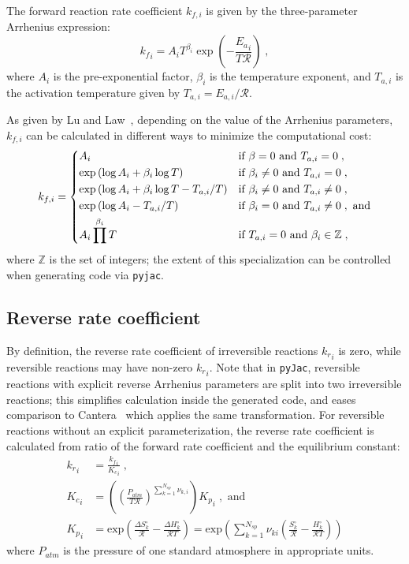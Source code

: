 \documentclass[12pt]{article}
\newcommand{\ns}{N_{sp}}
\newcommand{\Ru}{\mathcal{R}}
\begin{document}
The forward reaction rate coefficient $k_{f, i}$ is given by the three-parameter Arrhenius expression:
\begin{equation}
  \label{e:arrhenius}
  {k_f}_{i} = A_{i} T^{\beta_{i}} \operatorname{exp}\left({- \frac{{E_{a}}_{i}}{T \Ru}}\right) \;,
\end{equation}
where $A_i$ is the pre-exponential factor, $\beta_i$ is the temperature exponent, and $T_{a, i}$ is the activation temperature given by $T_{a, i} = E_{a, i} / \mathcal{R}$.

As given by Lu and Law~\cite{Lu:2009gh}, depending on the value of the Arrhenius parameters, $k_{f,i}$ can be calculated in different ways to minimize the computational cost:
\begin{equation}
  k_{f,i} =
  \begin{dcases}
  A_i & \text{if } \beta = 0 \text{ and } T_{a,i} = 0 \;, \\
  \exp \left( \log A_i + \beta_i \log T \right)   & \text{if } \beta_i \neq 0 \text{ and } T_{a, i} = 0 \;, \\
  \exp \left( \log A_i + \beta_i \log T - T_{a, i} / T \right) & \text{if } \beta_i \neq 0 \text{ and } T_{a, i} \neq 0 \;, \\
  \exp \left( \log A_i - T_{a, i} / T \right)  & \text{if } \beta_i = 0 \text{ and } T_{a, i} \neq 0 \;, \text{ and} \\
  A_i \prod^{\beta_i} T & \text{if } T_{a, i} = 0 \text{ and } \beta_i \in \mathbb{Z} \;,
  \end{dcases}
\end{equation}
where $\mathbb{Z}$ is the set of integers; the extent of this specialization can be controlled when generating code via \texttt{pyjac}.

\subsection{Reverse rate coefficient}
By definition, the reverse rate coefficient of irreversible reactions ${k_r}_{i}$ is zero, while reversible reactions may have non-zero ${k_r}_{i}$.
Note that in \texttt{pyJac}, reversible reactions with explicit reverse Arrhenius parameters are split into two irreversible reactions; this simplifies calculation inside the generated code, and eases comparison to Cantera~\cite{Goodwin:2015aa} which applies the same transformation.
For reversible reactions without an explicit parameterization, the reverse rate coefficient is calculated from ratio of the forward rate coefficient and the equilibrium constant:
\begin{align}
 {k_r}_{i} &= \frac{{k_f}_{i}}{{K_c}_{i}}\; , \label{e:kr}\\
 {K_c}_{i} &= \left(\left(\frac{P_{atm}}{T \Ru}\right)^{\sum_{k=1}^{\ns} \nu_{k,i}}\right) {K_p}_{i}\; ,\text{ and} \label{e:kc}\\
 {K_p}_{i} &= \text{exp}\left(\frac{\Delta S^{\circ}_k}{\Ru} - \frac{\Delta H^{\circ}_k}{\Ru T}\right) = \text{exp}\left(\sum_{k=1}^{\ns}\nu_{ki}\left(\frac{S^{\circ}_k}{\Ru} - \frac{H^{\circ}_k}{\Ru T}\right)\right) \label{e:kp}
\end{align}
where $P_{atm}$ is the pressure of one standard atmosphere in appropriate units.
\end{document}
